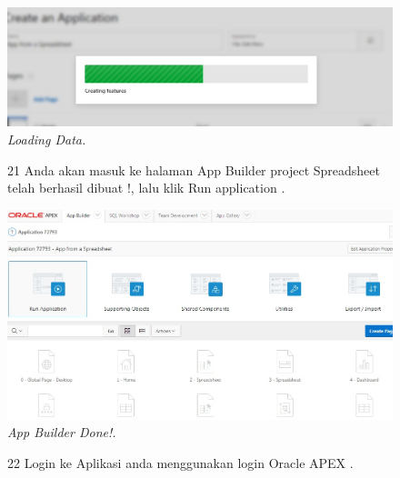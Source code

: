 \begin{enumerate}
\begin{figure}
    \begin{center}
\includegraphics[scale=0.4]{figures/create3.jpg}
    \caption{\textit{Loading Data.}}
        \end{center}
\label{gambar}
\end{figure}

\begin{figure}
\item[21]Anda akan masuk ke halaman App Builder project Spreadsheet telah berhasil dibuat !, lalu klik Run application .

    \begin{center}
\includegraphics[scale=0.4]{figures/create4.jpg}
    \caption{\textit{App Builder Done!.}}
        \end{center}
\label{gambar}
\end{figure}

\begin{figure}
\item[22]Login ke Aplikasi anda menggunakan login Oracle APEX .


\end{figure}
\end{enumerate}

